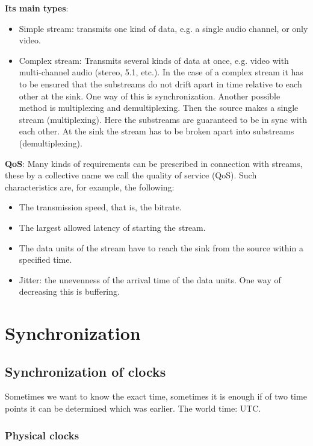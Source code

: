 \documentclass[margin=0px]{article}
\begin{document}
\noindent \textbf{Its main types}:
\begin{itemize}
    \item	Simple stream: transmits one kind of data, e.g. a single audio channel, or only video.
    \item	Complex stream: Transmits several kinds of data at once, e.g. video with multi-channel audio (stereo, 5.1, etc.).
          In the case of a complex stream it has to be ensured that the substreams do not drift apart in time relative to each other at the sink.
          One way of this is synchronization. Another possible method is multiplexing and demultiplexing. Then the source
          makes a single stream (multiplexing). Here the substreams are guaranteed to be in sync with each other. At the sink the
          stream has to be broken apart into substreams (demultiplexing).
\end{itemize}

\noindent \textbf{QoS}: Many kinds of requirements can be prescribed in connection with streams, these by a collective name
we call the quality of service (QoS). Such characteristics are, for example, the following:

\begin{itemize}
    \item	The transmission speed, that is, the bitrate.
    \item	The largest allowed latency of starting the stream.
    \item	The data units of the stream have to reach the sink from the source within a specified time.
    \item	Jitter: the unevenness of the arrival time of the data units. One way of decreasing this
          is buffering.
\end{itemize}

\section{Synchronization}

\subsection{Synchronization of clocks}
Sometimes we want to know the exact time, sometimes it is enough if of two time points it can be determined which was earlier.
The world time: UTC.\\

\subsubsection{Physical clocks}
\end{document}
